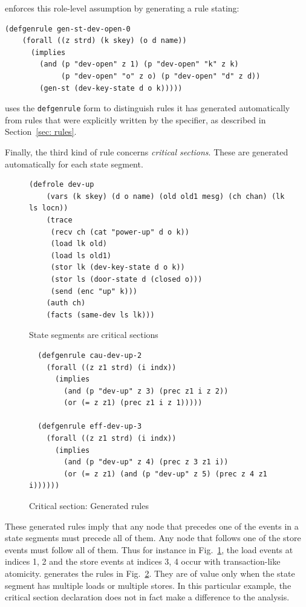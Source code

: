 {\cpsa} enforces this role-level assumption by generating a rule
stating:
%
{\small
\begin{verbatim}(defgenrule gen-st-dev-open-0
    (forall ((z strd) (k skey) (o d name))
      (implies
        (and (p "dev-open" z 1) (p "dev-open" "k" z k)
             (p "dev-open" "o" z o) (p "dev-open" "d" z d))
        (gen-st (dev-key-state d o k)))))
\end{verbatim}
}
%
\noindent{\cpsa} uses the \texttt{defgenrule} form to distinguish
rules it has generated automatically from rules that were explicitly
written by the specifier, as described in Section~\ref{sec: rules}.

Finally, the third kind of rule concerns \emph{critical sections}.
These are generated automatically for each state segment.  
%
\begin{figure}\small
%
\begin{verbatim}(defrole dev-up
    (vars (k skey) (d o name) (old old1 mesg) (ch chan) (lk ls locn))
    (trace
     (recv ch (cat "power-up" d o k))
     (load lk old)
     (load ls old1)
     (stor lk (dev-key-state d o k))
     (stor ls (door-state d (closed o)))
     (send (enc "up" k)))
    (auth ch)
    (facts (same-dev ls lk)))
\end{verbatim}
%
  \caption{State segments are critical sections}
  \label{fig:critical:section}
\end{figure}
%
%
\begin{figure}\small
\begin{verbatim}  (defgenrule cau-dev-up-2
    (forall ((z z1 strd) (i indx))
      (implies
        (and (p "dev-up" z 3) (prec z1 i z 2))
        (or (= z z1) (prec z1 i z 1)))))

  (defgenrule eff-dev-up-3
    (forall ((z z1 strd) (i indx))
      (implies
        (and (p "dev-up" z 4) (prec z 3 z1 i))
        (or (= z z1) (and (p "dev-up" z 5) (prec z 4 z1 i))))))\end{verbatim}
%
  \caption{Critical section:  Generated rules}
  \label{fig:critical:section:rules}
\end{figure}
%
These generated rules imply that any node that precedes one of the
events in a state segments must precede all of them.  Any node that
follows one of the store events must follow all of them.  Thus for
instance in Fig.~\ref{fig:critical:section}, the load events at
indices 1, 2 and the store events at indices 3, 4 occur with
transaction-like atomicity.  {\cpsa} generates the rules in
Fig.~\ref{fig:critical:section:rules}.  They are of value only when
the state segment has multiple loads or multiple stores.  In this
particular example, the critical section declaration does not in fact
make a difference to the analysis.
%
\label{state:gen:rules:end}

